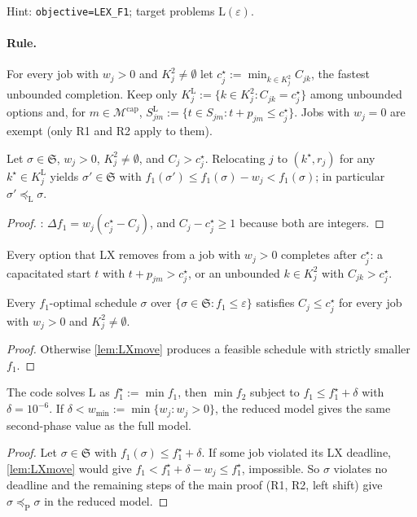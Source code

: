 \documentclass[11pt,a4paper]{article}
\newcommand{\M}{\mathcal{M}}
\newcommand{\Mcap}{\M^{\mathrm{cap}}}
\newcommand{\Sched}{\mathfrak{S}}
\newcommand{\code}[1]{\texttt{#1}}
\newcommand{\preceqP}{\preceq_{\mathrm{P}}}
\newcommand{\preceqL}{\preceq_{\mathrm{L}}}
\begin{document}
Hint: \code{objective=LEX\_F1}; target problems $\mathrm L(\varepsilon)$.

\paragraph{Rule.} For every job with $w_j>0$ and $K^2_j\neq\emptyset$ let
$c^\star_j:=\min_{k\in K^2_j}C_{jk}$, the fastest unbounded completion. Keep
only $K^{\mathrm L}_j:=\{k\in K^2_j : C_{jk}=c^\star_j\}$ among unbounded options
and, for $m\in\Mcap$, $S^{\mathrm L}_{jm}:=\{t\in S_{jm}: t+p_{jm}\le c^\star_j\}$.
Jobs with $w_j=0$ are exempt (only R1 and R2 apply to them).

\begin{lemma}[LX moves]\label{lem:LXmove}
Let $\sigma\in\Sched$, $w_j>0$, $K^2_j\ne\emptyset$, and $C_j>c^\star_j$.
Relocating $j$ to $(k^\star,r_j)$ for any $k^\star\in K^{\mathrm L}_j$ yields
$\sigma'\in\Sched$ with $f_1(\sigma')\le f_1(\sigma)-w_j<f_1(\sigma)$; in
particular $\sigma'\preceqL\sigma$.
\end{lemma}
\begin{proof}
: $\Delta f_1=w_j(c^\star_j-C_j)$, and $C_j-c^\star_j\ge1$
because both are integers.
\end{proof}

Every option that LX removes from a job with $w_j>0$ completes after
$c^\star_j$: a capacitated start $t$ with $t+p_{jm}>c^\star_j$, or an
unbounded $k\in K^2_j$ with $C_{jk}>c^\star_j$.

\begin{proposition}\label{prop:LXall}
Every $f_1$-optimal schedule $\sigma$ over $\{\sigma\in\Sched: f_1\le\varepsilon\}$
satisfies $C_j\le c^\star_j$ for every job with $w_j>0$ and
$K^2_j\ne\emptyset$.
\end{proposition}
\begin{proof}
Otherwise \cref{lem:LXmove} produces a feasible schedule with strictly
smaller $f_1$.
\end{proof}

\begin{proposition}\label{prop:tol}
The code solves $\mathrm L$ as $f_1^\star:=\min f_1$, then $\min f_2$ subject
to $f_1\le f_1^\star+\delta$ with $\delta=10^{-6}$. If
$\delta<w_{\min}:=\min\{w_j:w_j>0\}$, the reduced model gives the same
second-phase value as the full model.
\end{proposition}
\begin{proof}
Let $\sigma\in\Sched$ with $f_1(\sigma)\le f_1^\star+\delta$. If some job
violated its LX deadline, \cref{lem:LXmove} would give
$f_1<f_1^\star+\delta-w_j\le f_1^\star$, impossible. So $\sigma$ violates no
deadline and the remaining steps of the main proof (R1, R2, left shift) give
$\hat\sigma\preceqP\sigma$ in the reduced model.
\end{proof}
\end{document}
